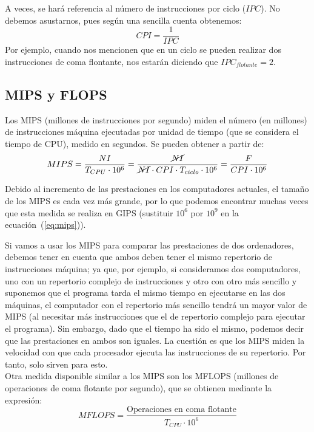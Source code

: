 A veces, se hará referencia al número de instrucciones por ciclo ($IPC$). No debemos asustarnos, pues según una sencilla cuenta obtenemos:
\begin{equation}
    CPI = \dfrac{1}{IPC}
\end{equation}
Por ejemplo, cuando nos mencionen que en un ciclo se pueden realizar dos instrucciones de coma flontante, nos estarán diciendo que $IPC_{flotante} = 2$.

\subsection{MIPS y FLOPS}
Los MIPS (millones de instrucciones por segundo) miden el número (en millones) de instrucciones máquina ejecutadas por unidad de tiempo (que se considera el tiempo de CPU), medido en segundos. Se pueden obtener a partir de:
\begin{equation} \label{eq:mips}
    MIPS = \dfrac{NI}{T_{CPU} \cdot 10^6} = \dfrac{\cancel{NI}}{\cancel{NI}\cdot CPI \cdot T_{ciclo} \cdot 10^6} = \dfrac{F}{CPI \cdot 10^6}
\end{equation}

Debido al incremento de las prestaciones en los computadores actuales, el tamaño de los MIPS es cada vez más grande, por lo que podemos encontrar muchas veces que esta medida se realiza en GIPS (sustituir $10^6$ por $10^9$ en la ecuación~(\ref{eq:mips})).

Si vamos a usar los MIPS para comparar las prestaciones de dos ordenadores, debemos tener en cuenta que ambos deben tener el mismo repertorio de instrucciones máquina; ya que, por ejemplo, si consideramos dos computadores, uno con un repertorio complejo de instrucciones y otro con otro más sencillo y suponemos que el programa tarda el mismo tiempo en ejecutarse en las dos máquinas, el computador con el repertorio más sencillo tendrá un mayor valor de MIPS (al necesitar más instrucciones que el de repertorio complejo para ejecutar el programa). Sin embargo, dado que el tiempo ha sido el mismo, podemos decir que las prestaciones en ambos son iguales. La cuestión es que los MIPS miden la velocidad con que cada procesador ejecuta las instrucciones de su repertorio. Por tanto, solo sirven para esto.\\

Otra medida disponible similar a los MIPS son los MFLOPS (millones de operaciones de coma flotante por segundo), que se obtienen mediante la expresión:
\begin{equation}
    MFLOPS = \dfrac{\text{Operaciones en coma flotante}}{T_{CPU} \cdot 10^6}
\end{equation}


